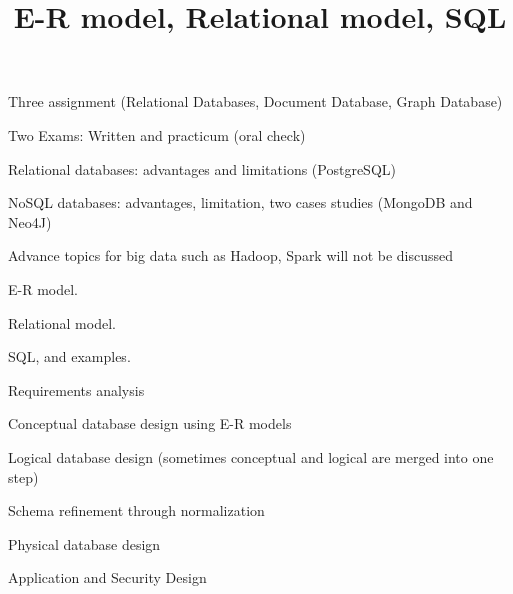 \documentclass{beamer}
\title{E-R model, Relational model, SQL}
\author{ }
\institute{Hogeschool Rotterdam \\ 
Rotterdam, Netherlands}
\date{}
\begin{document}
\maketitle



\begin{slide}{
\item Three assignment (Relational Databases, Document Database, Graph Database)
\item Two Exams: Written and practicum (oral check)
}\end{slide}

\begin{slide}{
\item Relational databases: advantages and limitations (PostgreSQL)
\item NoSQL databases: advantages, limitation, two cases studies (MongoDB and Neo4J)  
\item Advance topics for big data such as Hadoop, Spark will not be discussed
}\end{slide}


\begin{slide}{
\item E-R model.
\item Relational model.
\item SQL, and examples.
}\end{slide}

\begin{slide}{
\item Requirements analysis 
\pause
\item Conceptual database design using E-R models
\pause
\item Logical database design (sometimes conceptual and logical are merged into one step) 
\pause
\item Schema refinement through normalization
\pause
\item Physical database design
\pause
\item Application and Security Design
}\end{slide}
\end{document}
